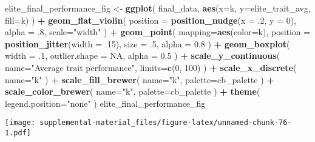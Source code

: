\documentclass[]{book}
\newenvironment{Shaded}{\begin{snugshade}}{\end{snugshade}}
\newcommand{\DataTypeTok}[1]{\textcolor[rgb]{0.13,0.29,0.53}{#1}}
\newcommand{\DecValTok}[1]{\textcolor[rgb]{0.00,0.00,0.81}{#1}}
\newcommand{\FloatTok}[1]{\textcolor[rgb]{0.00,0.00,0.81}{#1}}
\newcommand{\KeywordTok}[1]{\textcolor[rgb]{0.13,0.29,0.53}{\textbf{#1}}}
\newcommand{\NormalTok}[1]{#1}
\newcommand{\OperatorTok}[1]{\textcolor[rgb]{0.81,0.36,0.00}{\textbf{#1}}}
\newcommand{\OtherTok}[1]{\textcolor[rgb]{0.56,0.35,0.01}{#1}}
\newcommand{\StringTok}[1]{\textcolor[rgb]{0.31,0.60,0.02}{#1}}
\begin{document}
\begin{Shaded}
\begin{Highlighting}[]
\NormalTok{elite_final_performance_fig <-}\StringTok{ }\KeywordTok{ggplot}\NormalTok{(}
\NormalTok{    final_data,}
    \KeywordTok{aes}\NormalTok{(}\DataTypeTok{x=}\NormalTok{k, }\DataTypeTok{y=}\NormalTok{elite_trait_avg, }\DataTypeTok{fill=}\NormalTok{k)}
\NormalTok{  ) }\OperatorTok{+}
\StringTok{  }\KeywordTok{geom_flat_violin}\NormalTok{(}
    \DataTypeTok{position =} \KeywordTok{position_nudge}\NormalTok{(}\DataTypeTok{x =} \FloatTok{.2}\NormalTok{, }\DataTypeTok{y =} \DecValTok{0}\NormalTok{),}
    \DataTypeTok{alpha =} \FloatTok{.8}\NormalTok{,}
    \DataTypeTok{scale=}\StringTok{"width"}
\NormalTok{  ) }\OperatorTok{+}
\StringTok{  }\KeywordTok{geom_point}\NormalTok{(}
    \DataTypeTok{mapping=}\KeywordTok{aes}\NormalTok{(}\DataTypeTok{color=}\NormalTok{k),}
    \DataTypeTok{position =} \KeywordTok{position_jitter}\NormalTok{(}\DataTypeTok{width =} \FloatTok{.15}\NormalTok{),}
    \DataTypeTok{size =} \FloatTok{.5}\NormalTok{,}
    \DataTypeTok{alpha =} \FloatTok{0.8}
\NormalTok{  ) }\OperatorTok{+}
\StringTok{  }\KeywordTok{geom_boxplot}\NormalTok{(}
    \DataTypeTok{width =} \FloatTok{.1}\NormalTok{,}
    \DataTypeTok{outlier.shape =} \OtherTok{NA}\NormalTok{,}
    \DataTypeTok{alpha =} \FloatTok{0.5}
\NormalTok{  ) }\OperatorTok{+}
\StringTok{  }\KeywordTok{scale_y_continuous}\NormalTok{(}
    \DataTypeTok{name=}\StringTok{"Average trait performance"}\NormalTok{,}
    \DataTypeTok{limits=}\KeywordTok{c}\NormalTok{(}\DecValTok{0}\NormalTok{, }\DecValTok{100}\NormalTok{)}
\NormalTok{  ) }\OperatorTok{+}
\StringTok{  }\KeywordTok{scale_x_discrete}\NormalTok{(}
    \DataTypeTok{name=}\StringTok{"k"}
\NormalTok{  ) }\OperatorTok{+}
\StringTok{  }\KeywordTok{scale_fill_brewer}\NormalTok{(}
    \DataTypeTok{name=}\StringTok{"k"}\NormalTok{,}
    \DataTypeTok{palette=}\NormalTok{cb_palette}
\NormalTok{  ) }\OperatorTok{+}
\StringTok{  }\KeywordTok{scale_color_brewer}\NormalTok{(}
    \DataTypeTok{name=}\StringTok{"k"}\NormalTok{,}
    \DataTypeTok{palette=}\NormalTok{cb_palette}
\NormalTok{  ) }\OperatorTok{+}
\StringTok{  }\KeywordTok{theme}\NormalTok{(}
    \DataTypeTok{legend.position=}\StringTok{"none"}
\NormalTok{  )}
\NormalTok{elite_final_performance_fig}
\end{Highlighting}
\end{Shaded}

\texttt{[image: supplemental-material\_files/figure-latex/unnamed-chunk-76-1.pdf]}
\end{document}
